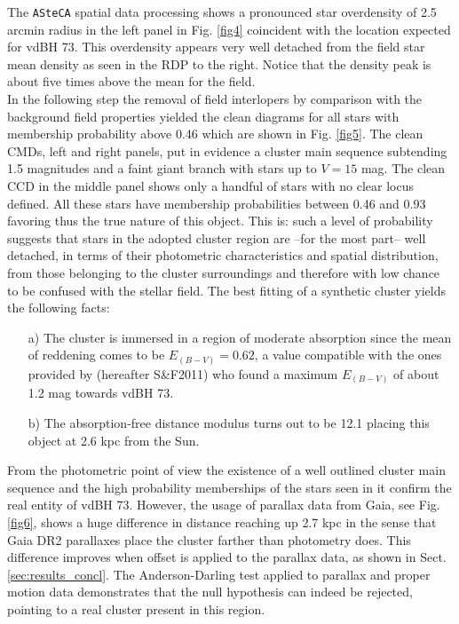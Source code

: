 \documentclass[draft]{aa}
\begin{document}
The \texttt{ASteCA} spatial data processing shows a pronounced star overdensity
of 2.5 arcmin radius in the left panel in Fig. \ref{fig4} coincident with the
location expected for vdBH 73. This overdensity appears very well
detached from the field star mean density as seen in the RDP to the right.
Notice that the density peak is about five times above the mean for the field.\\

In the following step the removal of field interlopers by comparison with the
background field properties yielded the clean diagrams for all stars with
membership probability above 0.46 which are shown in Fig. \ref{fig5}. The clean
CMDs, left and right panels, put in evidence a cluster main sequence subtending
1.5 magnitudes and a faint giant branch with stars up to $V=15$ mag. The clean
CCD in the middle panel shows only a handful of stars with no clear locus
defined. All these stars have membership probabilities between 0.46 and 0.93
favoring thus the true nature of this object. This is: such a level of
probability suggests that stars in the adopted cluster region are --for the
most part-- well detached, in terms of their photometric characteristics and
spatial distribution, from those belonging to the cluster surroundings and
therefore with low chance to be confused with the stellar field. The best
fitting of a synthetic cluster yields the following facts:

\begin{itemize}
\item [a)] The cluster is immersed in a region of moderate absorption since the
mean of reddening comes to be $E_{(B-V)} = 0.62$, a value compatible with the
ones provided by \cite{Schlafly_2011} (hereafter S\&F2011) who
found a maximum $E_{(B-V)}$ of about 1.2 mag towards vdBH 73.
\item [b)] The absorption-free distance modulus turns out to be 12.1 placing
this object at 2.6 kpc from the Sun.
\end{itemize}

From the photometric point of view the existence of a well outlined cluster main
sequence and the high probability memberships of the stars seen in it confirm
the real entity of vdBH 73. However, the usage of parallax data
from Gaia, see Fig. \ref{fig6}, shows a huge difference in distance reaching
up 2.7 kpc in the sense that Gaia DR2 parallaxes place the cluster farther than
photometry does. This difference improves when offset is applied to the
parallax data, as shown in Sect. \ref{sec:results_concl}.
The Anderson-Darling test applied to parallax and proper motion
data demonstrates that the null hypothesis can indeed be rejected, pointing to
a real cluster present in this region.\\
\end{document}
